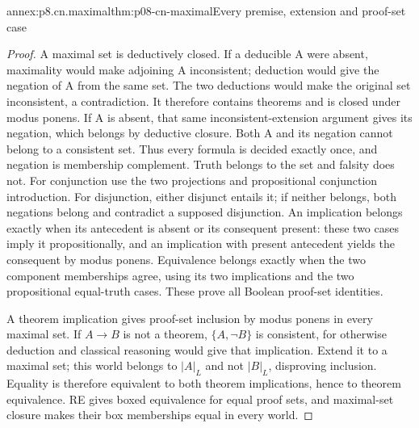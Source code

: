 \begin{annexitem}{annex:p8.cn.maximal}{thm:p08-cn-maximal}{Every premise, extension and proof-set case}
\begin{proof}
A maximal set is deductively closed. If a deducible A were absent,
maximality would make adjoining A inconsistent; deduction would
give the negation of A from the same set. The two deductions
would make the original set inconsistent, a contradiction.
It therefore contains theorems and is closed under modus ponens.
If A is absent, that same inconsistent-extension argument gives
its negation, which belongs by deductive closure. Both A and its
negation cannot belong to a consistent set. Thus every formula
is decided exactly once, and negation is membership complement.
Truth belongs to the set and falsity does not.
For conjunction use the two projections and propositional
conjunction introduction. For disjunction, either disjunct entails
it; if neither belongs, both negations belong and contradict
a supposed disjunction. An implication belongs exactly when
its antecedent is absent or its consequent present: these two
cases imply it propositionally, and an implication with present
antecedent yields the consequent by modus ponens. Equivalence
belongs exactly when the two component memberships agree, using
its two implications and the two propositional equal-truth cases.
These prove all Boolean proof-set identities.

A theorem implication gives proof-set inclusion by modus ponens
in every maximal set. If \(A\to B\) is not a theorem,
\(\{A,\neg B\}\) is consistent, for otherwise deduction
and classical reasoning would give that implication. Extend it
to a maximal set; this world belongs to \(|A|_L\) and not
\(|B|_L\), disproving inclusion. Equality is therefore equivalent
to both theorem implications, hence to theorem equivalence.
RE gives boxed equivalence for equal proof sets, and maximal-set
closure makes their box memberships equal in every world.
\end{proof}
\end{annexitem}

